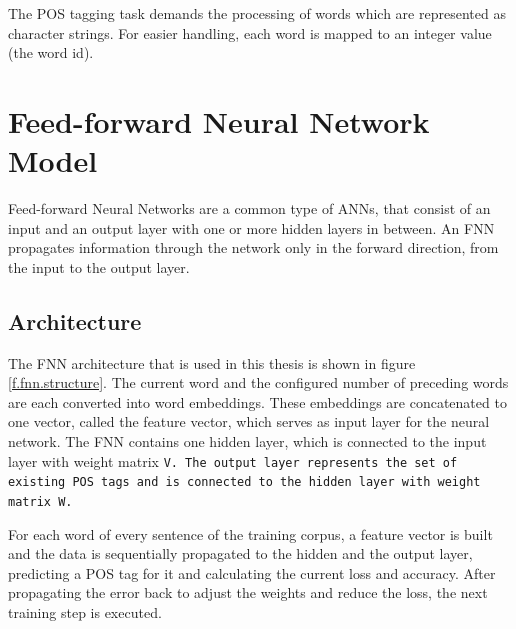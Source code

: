 The POS tagging task demands the processing of words which are represented as character strings. For easier handling, each word is mapped to an integer value (the word id).

\section{Feed-forward Neural Network Model}\label{c.postagging.fnn}
Feed-forward Neural Networks are a common type of ANNs, that consist of an input and an output layer with one or more hidden layers in between. An FNN propagates information through the network only in the forward direction, from the input to the output layer.

\subsection{Architecture}\label{c.postagging.fnn.architecture}
The FNN architecture that is used in this thesis is shown in figure \ref{f.fnn.structure}. The current word and the configured number of preceding words are each converted into word embeddings. These embeddings are concatenated to one vector, called the feature vector, which serves as input layer for the neural network. The FNN contains one hidden layer, which is connected to the input layer with weight matrix \tt{V}. The output layer represents the set of existing POS tags and is connected to the hidden layer with weight matrix \tt{W}.

For each word of every sentence of the training corpus, a feature vector is built and the data is sequentially propagated to the hidden and the output layer, predicting a POS tag for it and calculating the current loss and accuracy. After propagating the error back to adjust the weights and reduce the loss, the next training step is executed.

